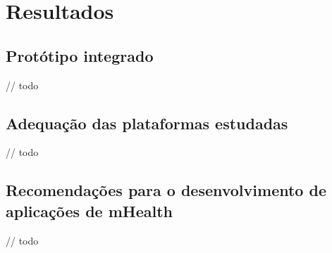 \chapter{Resultados}
\section{Protótipo integrado}
// todo

\section{Adequação das plataformas estudadas}
// todo

\section{Recomendações para o desenvolvimento de aplicações de mHealth}
// todo

\cleardoublepage